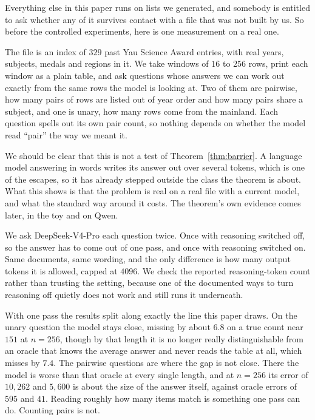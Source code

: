 \documentclass[10pt]{article}
\theoremstyle{definition}
\begin{document}
Everything else in this paper runs on lists we generated, and somebody is
entitled to ask whether any of it survives contact with a file that was
not built by us. So before the controlled experiments, here is one
measurement on a real one.

The file is an index of $329$ past Yau Science Award entries, with real
years, subjects, medals and regions in it. We take windows of $16$ to $256$
rows, print each window as a plain table, and ask questions whose answers we can work out exactly from the same rows the model is looking at. Two of
them are pairwise, how many pairs of rows are listed out of year order and
how many pairs share a subject, and one is unary, how many rows come from
the mainland. Each question spells out its own pair count, so nothing
depends on whether the model read ``pair'' the way we meant it.

We should be clear that this is not a test of Theorem~\ref{thm:barrier}. A
language model answering in words writes its answer out over several
tokens, which is one of the escapes, so it has already stepped outside the
class the theorem is about. What this shows is that the problem is real on
a real file with a current model, and what the standard way around it
costs. The theorem's own evidence comes later, in the toy and on Qwen.

We ask DeepSeek-V4-Pro each question twice. Once with reasoning switched
off, so the answer has to come out of one pass, and once with reasoning
switched on. Same documents, same wording, and the only difference is how
many output tokens it is allowed, capped at $4096$. We check the reported reasoning-token count rather than trusting the setting, because one of the
documented ways to turn reasoning off quietly does not work and still runs
it underneath.

With one pass the results split along exactly the line this paper draws.
On the unary question the model stays close, missing by about $6.8$ on a
true count near $151$ at $n = 256$, though by that length it is no longer
really distinguishable from an oracle that knows the average answer and
never reads the table at all, which misses by $7.4$. The pairwise
questions are where the gap is not close. There the model is worse than
that oracle at every single length, and at $n = 256$ its error of $10{,}262$
and $5{,}600$ is about the size of the answer itself, against oracle errors
of $595$ and $41$. Reading roughly how many items match is something one
pass can do. Counting pairs is not.
\end{document}
